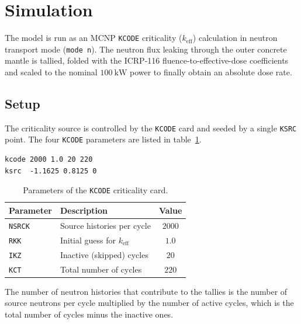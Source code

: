 \section{Simulation}

The model is run as an MCNP \texttt{KCODE} criticality ($k_{\mathrm{eff}}$) calculation in neutron transport mode (\texttt{mode n}).
The neutron flux leaking through the outer concrete mantle is tallied, folded with the ICRP-116 fluence-to-effective-dose coefficients \cite{icrp} and scaled to the nominal $100~\mathrm{kW}$ power to finally obtain an absolute dose rate.

\subsection{Setup}

The criticality source is controlled by the \texttt{KCODE} card and seeded by a single \texttt{KSRC} point. The four \texttt{KCODE} parameters are listed in table~\ref{tab:kcode}.

\begin{lstlisting}[numbers=none]
kcode 2000 1.0 20 220
ksrc  -1.1625 0.8125 0
\end{lstlisting}

\begin{table}[H]
  \centering
  \caption{Parameters of the \texttt{KCODE} criticality card.}
  \label{tab:kcode}
  \begin{tabular}{llc}
    \toprule
    Parameter & Description & Value \\
    \midrule
    \texttt{NSRCK} & Source histories per cycle          & $2000$ \\
    \texttt{RKK}   & Initial guess for $k_{\mathrm{eff}}$ & $1.0$  \\
    \texttt{IKZ}   & Inactive (skipped) cycles           & $20$   \\
    \texttt{KCT}   & Total number of cycles              & $220$  \\
    \bottomrule
  \end{tabular}
\end{table}

The number of neutron histories that contribute to the tallies is the number of source neutrons per cycle multiplied by the number of active cycles, which is the total number of cycles minus the inactive ones.

